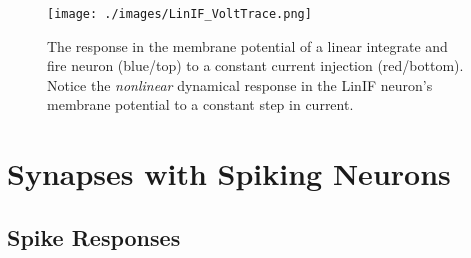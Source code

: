 \begin{figure}[h]
\centering
\texttt{[image: ./images/LinIF\_VoltTrace.png]}
\caption[Simbrain screenshot by Zo\"e Tosi]{The response in the membrane potential of a linear integrate and fire neuron (blue/top) to a constant current injection (red/bottom). Notice the \emph{nonlinear} dynamical response in the LinIF neuron's membrane potential to a constant step in current. }
\label{LinIF_Traces}
\end{figure}



\section{Synapses with Spiking Neurons}


\subsection{Spike Responses}

